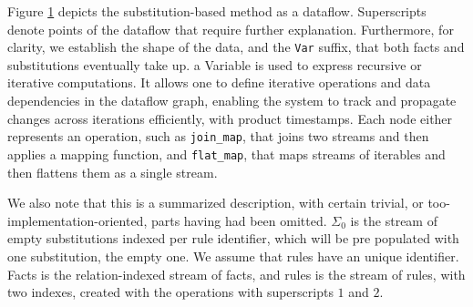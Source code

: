 \documentclass[sigconf,screen,review,natbib]{acmart}
\theoremstyle{definition}
\begin{document}
\begin{figure} [htb!]
	\caption{}
	\label{fig:substitution_simple_ddflow}
\end{figure}

Figure \ref{fig:substitution_simple_ddflow} depicts the substitution-based method as a dataflow. Superscripts denote
points of the dataflow that require further explanation. Furthermore, for clarity, we establish the shape of the
data, and the \verb|Var| suffix, that both facts and substitutions eventually take up. a Variable is used to express
recursive or iterative computations. It allows one to define iterative operations and data dependencies in the dataflow
graph, enabling the system to track and propagate changes across iterations efficiently, with product timestamps. Each
node either represents an operation, such as \verb|join_map|, that joins two streams and then applies a mapping function,
and \verb|flat_map|, that maps streams of iterables and then flattens them as a single stream.

We also note that this is a summarized description, with certain trivial, or too-implementation-oriented, parts
having had been omitted. $\Sigma_0$ is the stream of empty substitutions indexed per rule identifier, which will
be pre populated with one substitution, the empty one. We assume that rules have an unique identifier. Facts is
the relation-indexed stream of facts, and rules is the stream of rules, with two indexes, created with the operations
with superscripts $1$ and $2$.
\end{document}
